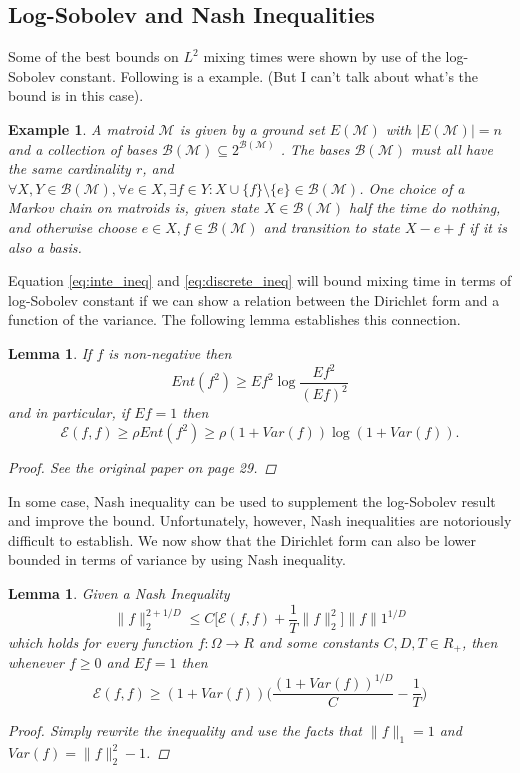 \documentclass[12pt,reqno]{amsart}
\newtheorem{lem}[thm]{Lemma}
\newtheorem{example}[thm]{Example}
\begin{document}
\subsection{Log-Sobolev and Nash Inequalities}
Some of the best bounds on $L^2$ mixing times were shown by use of the log-Sobolev constant. Following is a example. (But I can't talk about what's the bound is in this case).
\begin{example}
  A matroid $\mathcal{M}$ is given by a ground set $E(\mathcal{M})$ with 
$|E(\mathcal{M})|=n$ and a collection of bases $\mathcal{B(M)}\subseteq 2^{\mathcal{B(M)}}$
. The bases $\mathcal{B(M)}$ must all have the same cardinality $r$, and $\forall X,Y\in \mathcal{B(M)}, \forall e\in X, \exists f\in Y : X\cup\{f\}\setminus \{e\}\in \mathcal{B(M)}$. One choice of a Markov chain on matroids is, given state $X\in \mathcal{B(M)}$ half the time do nothing, and otherwise choose $e\in X, f\in \mathcal{B(M)}$ and transition to state $X-e+f$ if it is also a basis.
\end{example}

Equation \eqref{eq:inte_ineq} and \eqref{eq:discrete_ineq} will bound mixing time in terms of log-Sobolev constant if we can show a relation between the Dirichlet form and a function of the variance. The following lemma establishes this connection.

\begin{lem}
  If $f$ is non-negative then
$$
Ent(f^2) \geq Ef^2 \log \frac{Ef^2}{(Ef)^2}
$$
and in particular, if $Ef=1$ then 
$$
\mathcal{E}(f,f) \geq \rho Ent(f^2) \geq \rho (1 + Var(f))\log (1 + Var(f)).
$$

\begin{proof}
  See the original paper on page 29.
\end{proof}
\end{lem}

In some case, Nash inequality can be used to supplement the log-Sobolev result and improve the bound. Unfortunately, however, Nash inequalities are notoriously difficult to establish. We now show that the Dirichlet form can also be lower bounded in terms of variance by using Nash inequality.

\begin{lem}
  Given a Nash Inequality
$$
\|f\|_2^{2+1/D} \leq C \bigg [ \mathcal{E}(f,f)+\frac{1}{T}\|f\|_2^2 \bigg] \|f\|1^{1/D}
$$
which holds for every function $f: \Omega \rightarrow R$ and some constants $C,D,T\in R_+$, then whenever $f\geq 0$ and $Ef=1$ then
$$
\mathcal{E}(f,f) \geq (1 + Var(f)) \bigg ( \frac{(1+Var(f))^{1/D}}{C} - \frac{1}{T} \bigg )
$$
\begin{proof}
  Simply rewrite the inequality and use the facts that $\|f\|_1 = 1$ and  $Var(f) = \|f\|_2^2-1$.
\end{proof}
\end{lem}
\end{document}
